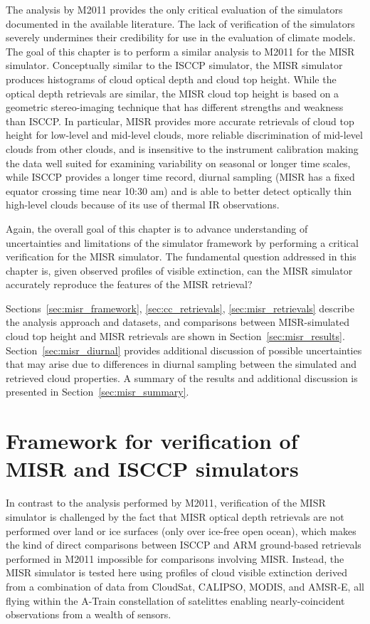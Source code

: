 The analysis by M2011 provides the only critical evaluation of the
simulators documented in the available literature. The lack of
verification of the simulators severely undermines their credibility for
use in the evaluation of climate models. The goal of this chapter is to
perform a similar analysis to M2011 for the MISR simulator. Conceptually
similar to the ISCCP simulator, the MISR simulator produces histograms
of cloud optical depth and cloud top height. While the optical depth
retrievals are similar, the MISR cloud top height is based on a
geometric stereo-imaging technique that has different strengths and
weakness than ISCCP. In particular, MISR provides more accurate
retrievals of cloud top height for low-level and mid-level clouds, more
reliable discrimination of mid-level clouds from other clouds, and is
insensitive to the instrument calibration making the data well suited
for examining variability on seasonal or longer time scales, while ISCCP
provides a longer time record, diurnal sampling (MISR has a fixed
equator crossing time near 10:30 am) and is able to better detect
optically thin high-level clouds because of its use of thermal IR
observations.

Again, the overall goal of this chapter is to advance understanding of
uncertainties and limitations of the simulator framework by performing a
critical verification for the MISR simulator. The fundamental question
addressed in this chapter is, given observed profiles of visible
extinction, can the MISR simulator accurately reproduce the features of
the MISR retrieval?

Sections~\ref{sec:misr_framework}, \ref{sec:cc_retrievals}, \ref{sec:misr_retrievals}
describe the analysis approach and datasets, and comparisons between
MISR-simulated cloud top height and MISR retrievals are shown in
Section~\ref{sec:misr_results}. Section~\ref{sec:misr_diurnal} provides
additional discussion of possible uncertainties that may arise due to
differences in diurnal sampling between the simulated and retrieved
cloud properties. A summary of the results and additional discussion is
presented in Section~\ref{sec:misr_summary}.

\section{Framework for verification of MISR and ISCCP
simulators}\label{sec:misrux5fframework}

In contrast to the analysis performed by M2011, verification of the MISR
simulator is challenged by the fact that MISR optical depth retrievals
are not performed over land or ice surfaces (only over ice-free open
ocean), which makes the kind of direct comparisons between ISCCP and ARM
ground-based retrievals performed in M2011 impossible for comparisons
involving MISR. Instead, the MISR simulator is tested here using
profiles of cloud visible extinction derived from a combination of data
from CloudSat, CALIPSO, MODIS, and AMSR-E, all flying within the A-Train
constellation of satelittes enabling nearly-coincident observations from
a wealth of sensors.

